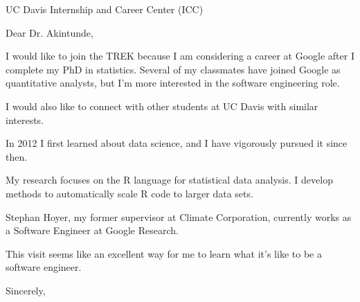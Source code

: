 \documentclass{letter}
\begin{document}
\begin{letter}{UC Davis Internship and Career Center (ICC)}
\opening{Dear Dr. Akintunde,}

I would like to join the TREK because I am considering a career
at Google after I complete my PhD in statistics. Several of my classmates have
joined Google as quantitative analysts, but I'm more interested in the
software engineering role.

I would also like to connect with other students at UC Davis with similar
    interests.

In 2012 I first learned about data science, and I have vigorously pursued
it since then.

My research focuses on the R language for statistical data analysis. I
develop methods to automatically scale R code to larger data sets.

Stephan Hoyer, my former supervisor at Climate Corporation,
currently works as a Software Engineer at Google Research.

This visit seems like an excellent way for me to learn what it's like to be a
software engineer.


\closing{Sincerely,}
\end{letter}
\end{document}
